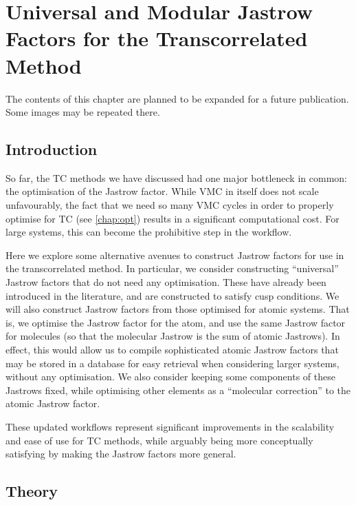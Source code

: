 \chapter{Universal and Modular Jastrow Factors for the Transcorrelated Method}
\label{chap:universal}

The contents of this chapter are planned to be expanded for a future publication. Some images may be repeated there.

\section{Introduction}

So far, the \gls{TC} methods we have discussed had one major bottleneck in common: the optimisation of the Jastrow factor. While VMC in itself does not scale unfavourably, the fact that we need so many VMC cycles in order to properly optimise for TC (see \autoref{chap:opt}) results in a significant computational cost. For large systems, this can become the prohibitive step in the workflow.

Here we explore some alternative avenues to construct Jastrow factors for use in the transcorrelated method. In particular, we consider constructing ``universal'' Jastrow factors that do not need any optimisation. These have already been introduced in the literature,\supercite{fournaisNonIsotropic2007,fournaisSharp2005,tewSecond2008,szenesStriking2024} and are constructed to satisfy cusp conditions. We will also construct Jastrow factors from those optimised for atomic systems. That is, we optimise the Jastrow factor for the atom, and use the same Jastrow factor for molecules (so that the molecular Jastrow is the sum of atomic Jastrows). In effect, this would allow us to compile sophisticated atomic Jastrow factors that may be stored in a database for easy retrieval when considering larger systems, without any optimisation. We also consider keeping some components of these Jastrows fixed, while optimising other elements as a ``molecular correction'' to the atomic Jastrow factor.

These updated workflows represent significant improvements in the scalability and ease of use for TC methods, while arguably being more conceptually satisfying by making the Jastrow factors more general.

\section{Theory}

